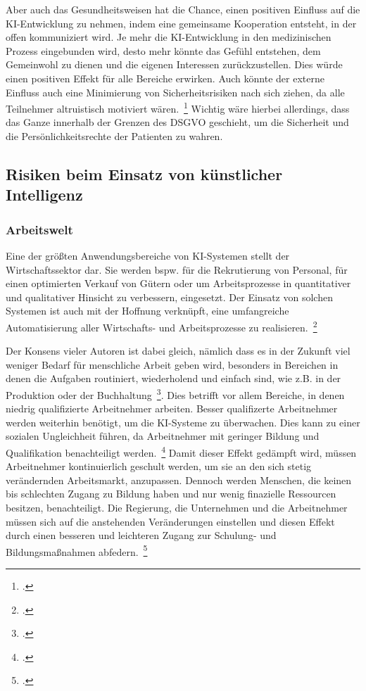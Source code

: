 Aber auch das Gesundheitsweisen hat die Chance, einen positiven Einfluss auf die \ac{KI}-Entwicklung zu nehmen, indem eine gemeinsame Kooperation entsteht, in der offen kommuniziert wird.
Je mehr die \ac{KI}-Entwicklung in den medizinischen Prozess eingebunden wird, desto mehr könnte das Gefühl entstehen, dem Gemeinwohl zu dienen und die eigenen
Interessen zurückzustellen. Dies würde einen positiven Effekt für alle Bereiche erwirken. Auch könnte der externe Einfluss auch eine Minimierung von 
Sicherheitsrisiken nach sich ziehen, da alle Teilnehmer altruistisch motiviert wären.~\footcite[\vglf][]{Buchkremer.2020} 
Wichtig wäre hierbei allerdings, dass das Ganze innerhalb der Grenzen des \ac{DSGVO} geschieht, um die Sicherheit und die Persönlichkeitsrechte der Patienten zu wahren.

\subsection{Risiken beim Einsatz von künstlicher Intelligenz}
\subsubsection{Arbeitswelt}
Eine der größten Anwendungsbereiche von \ac{KI}-Systemen stellt der Wirtschaftssektor dar. Sie werden bspw. für die Rekrutierung von Personal, für einen optimierten Verkauf von Gütern oder um
Arbeitsprozesse in quantitativer und qualitativer Hinsicht zu verbessern, eingesetzt. Der Einsatz von solchen Systemen ist auch mit der Hoffnung verknüpft, eine umfangreiche
Automatisierung aller Wirtschafts- und Arbeitsprozesse zu realisieren.~\footcite[\vglf][]{Heinrichs.2022}

Der Konsens vieler Autoren ist dabei gleich, nämlich dass es in der Zukunft viel weniger Bedarf für menschliche Arbeit geben wird, besonders in Bereichen in denen die Aufgaben routiniert, wiederholend und einfach sind, wie z.B. in der Produktion oder der Buchhaltung~\footcite[\vglf][]{Robot.2023}.
Dies betrifft vor allem Bereiche, in denen niedrig qualifizierte Arbeitnehmer arbeiten. Besser qualifizerte Arbeitnehmer werden weiterhin 
benötigt, um die \ac{KI}-Systeme zu überwachen. Dies kann zu einer sozialen Ungleichheit führen, da Arbeitnehmer mit geringer Bildung 
und Qualifikation benachteiligt werden.~\footcite[\vglf][]{Robot.2023} Damit dieser Effekt gedämpft wird, müssen Arbeitnehmer
kontinuierlich geschult werden, um sie an den sich stetig verändernden Arbeitsmarkt, anzupassen.
Dennoch werden Menschen, die keinen bis schlechten Zugang zu Bildung haben und nur wenig finazielle Ressourcen besitzen, benachteiligt. 
Die Regierung, die Unternehmen und die Arbeitnehmer müssen sich auf die anstehenden Veränderungen einstellen und diesen Effekt durch einen besseren und leichteren
Zugang zur Schulung- und Bildungsmaßnahmen abfedern.~\footcite[\vglf][]{Robot.2023}


